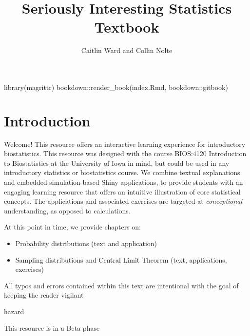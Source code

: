 \documentclass[
]{book}
\title{Seriously Interesting Statistics Textbook}
\author{Caitlin Ward and Collin Nolte}
\date{}
\newenvironment{Shaded}{\begin{snugshade}}{\end{snugshade}}
\newcommand{\FunctionTok}[1]{\textcolor[rgb]{0.00,0.00,0.00}{#1}}
\newcommand{\NormalTok}[1]{#1}
\newcommand{\SpecialCharTok}[1]{\textcolor[rgb]{0.00,0.00,0.00}{#1}}
\newcommand{\StringTok}[1]{\textcolor[rgb]{0.31,0.60,0.02}{#1}}
\providecommand{\tightlist}{%
  \setlength{\itemsep}{0pt}\setlength{\parskip}{0pt}}
\theoremstyle{definition}
\theoremstyle{definition}
\theoremstyle{definition}
\theoremstyle{remark}
\begin{document}
\maketitle

{
\setcounter{tocdepth}{1}
\tableofcontents
}
\begin{Shaded}
\begin{Highlighting}[]
\FunctionTok{library}\NormalTok{(magrittr)}
\NormalTok{bookdown}\SpecialCharTok{::}\FunctionTok{render\_book}\NormalTok{(}\StringTok{\textquotesingle{}index.Rmd\textquotesingle{}}\NormalTok{, }\StringTok{\textquotesingle{}bookdown::gitbook\textquotesingle{}}\NormalTok{)}
\end{Highlighting}
\end{Shaded}

\hypertarget{introduction}{%
\chapter*{Introduction}\label{introduction}}

Welcome! This resource offers an interactive learning experience for introductory biostatistics. This resource was designed with the course BIOS:4120 Introduction to Biostatistics at the University of Iowa in mind, but could be used in any introductory statistics or biostatistics course. We combine textual explanations and embedded simulation-based Shiny applications, to provide students with an engaging learning resource that offers an intuitive illustration of core statistical concepts. The applications and associated exercises are targeted at \emph{conceptional} understanding, as opposed to calculations.

At this point in time, we provide chapters on:

\begin{itemize}
\tightlist
\item
  Probability distributions (text and application)
\item
  Sampling distributions and Central Limit Theorem (text, applications, exercises)
\end{itemize}

All typos and errors contained within this text are intentional with the goal of keeping the reader vigilant

\begin{infobox}hazard

This resource is in a Beta phase

\end{infobox}
\end{document}
